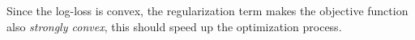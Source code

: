 \begin{rmk}
Since the log-loss is convex, the regularization term makes the objective function also \emph{strongly convex}, this should speed up the optimization process.
\end{rmk}


